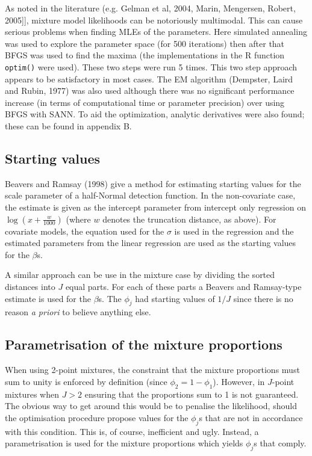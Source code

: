 \documentclass[useAMS,referee, usegraphicx]{biom}
\begin{document}
As noted in the literature (e.g. Gelman et al, 2004, Marin, Mengersen, Robert, 2005]], mixture model likelihoods can be notoriously multimodal. This can cause serious problems when finding MLEs of the parameters. Here simulated annealing was used to explore the parameter space (for 500 iterations) then after that BFGS was used to find the maxima (the implementations in the \textsf{R} function \texttt{optim()} were used). These two steps were run 5 times. This two step approach appears to be satisfactory in most cases. The EM algorithm (Dempster, Laird and Rubin, 1977) was also used although there was no significant performance increase (in terms of computational time or parameter precision) over using BFGS with SANN. To aid the optimization, analytic derivatives were also found; these can be found in appendix B.

\subsection{Starting values}
Beavers and Ramsay (1998) give a method for estimating starting values for the scale parameter of a half-Normal detection function. In the non-covariate case, the estimate is given as the intercept parameter from intercept only regression on $\log(x+\frac{w}{1000})$ (where $w$ denotes the truncation distance, as above). For covariate models, the equation used for the $\sigma$ is used in the regression and the estimated parameters from the linear regression are used as the starting values for the $\beta$s.

A similar approach can be use in the mixture case by dividing the sorted distances into $J$ equal parts. For each of these parts a Beavers and Ramsay-type estimate is used for the $\beta$s. The $\phi_j$ had starting values of $1/J$ since there is no reason \textit{a priori} to believe anything else.

\subsection{Parametrisation of the mixture proportions}

When using 2-point mixtures, the constraint that the mixture proportions must sum to unity is enforced by definition (since $\phi_2=1-\phi_1$). However, in $J$-point mixtures when $J>2$ ensuring that the proportions sum to 1 is not guaranteed. The obvious way to get around this would be to penalise the likelihood, should the optimisation procedure propose values for the $\phi_j$s that are not in accordance with this condition. This is, of course, inefficient and ugly. Instead, a parametrisation is used for the mixture proportions which yields $\phi_j$s that comply.
\end{document}
